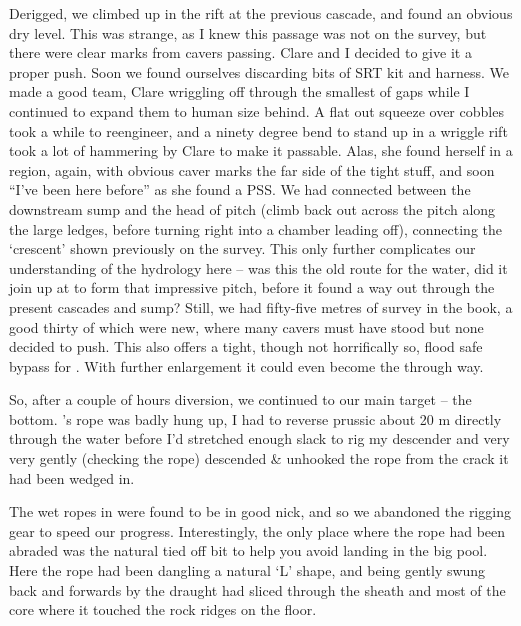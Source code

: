 Derigged, we climbed up in the rift at the previous cascade, and found
an obvious dry level. This was strange, as I knew this passage was not
on the survey, but there were clear marks from cavers passing. Clare and
I decided to give it a proper push. Soon we found ourselves discarding
bits of SRT kit and harness. We made a good team, Clare wriggling off
through the smallest of gaps while I continued to expand them to human
size behind. A flat out squeeze over cobbles took a while to reengineer,
and a ninety degree bend to stand up in a wriggle rift took a lot of
hammering by Clare to make it passable. Alas, she found herself in a
region, again, with obvious caver marks the far side of the tight stuff,
and soon ``I've been here before'' as she found a  PSS. We had
connected between the downstream  sump and the head of
 pitch (climb back out across the pitch along the large
ledges, before turning right into a chamber leading off), connecting the
`crescent' shown previously on the survey. This only further complicates
our understanding of the hydrology here -- was this the old route for
the  water, did it join up at  to form that
impressive pitch, before it found a way out through the present cascades
and sump? Still, we had fifty-five metres of survey in the book, a good
thirty of which were new, where many cavers must have stood but none
decided to push. This also offers a tight, though not horrifically so,
flood safe bypass for . With further enlargement it could even
become the through way.

So, after a couple of hours diversion, we continued to our main target
-- the bottom. 's rope was badly hung up, I had to
reverse prussic about 20 m directly through the water before I'd
stretched enough slack to rig my descender and very very gently
(checking the rope) descended \& unhooked the rope from the crack it had
been wedged in.

The wet ropes in  were found to be in good nick, and so
we abandoned the rigging gear to speed our progress. Interestingly, the
only place where the rope had been abraded was the natural tied off bit
to help you avoid landing in the big pool. Here the rope had been
dangling a natural `L' shape, and being gently swung back and forwards
by the draught had sliced through the sheath and most of the core where
it touched the rock ridges on the floor.


